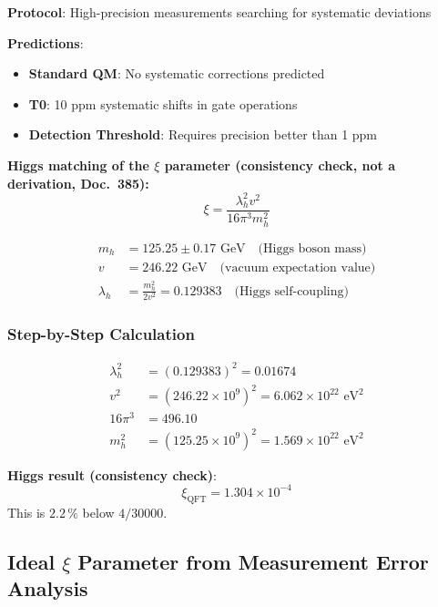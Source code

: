 	\textbf{Protocol}: High-precision measurements searching for systematic deviations
	
	\textbf{Predictions}:
	\begin{itemize}
		\item \textbf{Standard QM}: No systematic corrections predicted
		\item \textbf{T0}: 10 ppm systematic shifts in gate operations
		\item \textbf{Detection Threshold}: Requires precision better than 1 ppm
	\end{itemize}
	
	\textbf{Higgs matching of the $\xi$ parameter (consistency check, not a derivation, Doc.~385):}
	\begin{equation}
		\xi = \frac{\lambda_h^2 v^2}{16\pi^3 m_h^2}
		\label{eq:higgs_xi_appendix}
	\end{equation}
	
	\begin{align}
		m_h &= 125.25 \pm 0.17 \text{ GeV} \quad \text{(Higgs boson mass)} \\
		v &= 246.22 \text{ GeV} \quad \text{(vacuum expectation value)} \\
		\lambda_h &= \frac{m_h^2}{2v^2} = 0.129383 \quad \text{(Higgs self-coupling)}
	\end{align}
	
	\subsubsection{Step-by-Step Calculation}
	
	\begin{align}
		\lambda_h^2 &= (0.129383)^2 = 0.01674 \\
		v^2 &= (246.22 \times 10^9)^2 = 6.062 \times 10^{22} \text{ eV}^2 \\
		16\pi^3 &= 496.10 \\
		m_h^2 &= (125.25 \times 10^9)^2 = 1.569 \times 10^{22} \text{ eV}^2
	\end{align}
	
	\textbf{Higgs result (consistency check)}:
	\begin{equation}
		\xi_{\text{QFT}} = 1.304 \times 10^{-4}
	\end{equation}
	This is $2.2\,\%$ below $4/30000$.
	
	\subsection{Ideal $\xi$ Parameter from Measurement Error Analysis}
	

